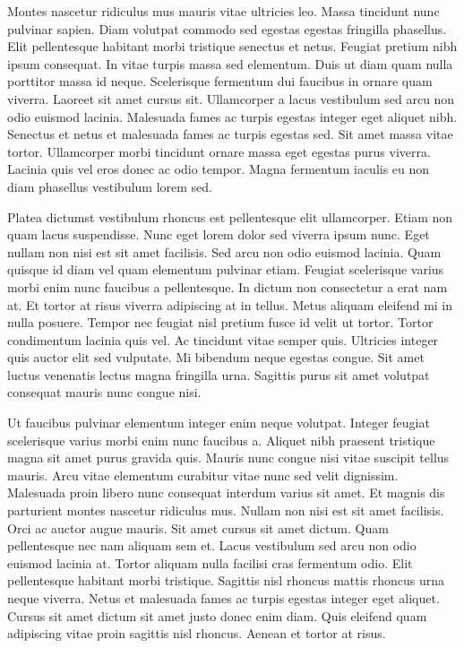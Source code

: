 \documentclass[11pt,a4paper]{article}
\begin{document}
Montes nascetur ridiculus mus mauris vitae ultricies leo. Massa tincidunt nunc pulvinar sapien. Diam volutpat commodo sed egestas egestas fringilla phasellus. Elit pellentesque habitant morbi tristique senectus et netus. Feugiat pretium nibh ipsum consequat. In vitae turpis massa sed elementum. Duis ut diam quam nulla porttitor massa id neque. Scelerisque fermentum dui faucibus in ornare quam viverra. Laoreet sit amet cursus sit. Ullamcorper a lacus vestibulum sed arcu non odio euismod lacinia. Malesuada fames ac turpis egestas integer eget aliquet nibh. Senectus et netus et malesuada fames ac turpis egestas sed. Sit amet massa vitae tortor. Ullamcorper morbi tincidunt ornare massa eget egestas purus viverra. Lacinia quis vel eros donec ac odio tempor. Magna fermentum iaculis eu non diam phasellus vestibulum lorem sed.

Platea dictumst vestibulum rhoncus est pellentesque elit ullamcorper. Etiam non quam lacus suspendisse. Nunc eget lorem dolor sed viverra ipsum nunc. Eget nullam non nisi est sit amet facilisis. Sed arcu non odio euismod lacinia. Quam quisque id diam vel quam elementum pulvinar etiam. Feugiat scelerisque varius morbi enim nunc faucibus a pellentesque. In dictum non consectetur a erat nam at. Et tortor at risus viverra adipiscing at in tellus. Metus aliquam eleifend mi in nulla posuere. Tempor nec feugiat nisl pretium fusce id velit ut tortor. Tortor condimentum lacinia quis vel. Ac tincidunt vitae semper quis. Ultricies integer quis auctor elit sed vulputate. Mi bibendum neque egestas congue. Sit amet luctus venenatis lectus magna fringilla urna. Sagittis purus sit amet volutpat consequat mauris nunc congue nisi.

Ut faucibus pulvinar elementum integer enim neque volutpat. Integer feugiat scelerisque varius morbi enim nunc faucibus a. Aliquet nibh praesent tristique magna sit amet purus gravida quis. Mauris nunc congue nisi vitae suscipit tellus mauris. Arcu vitae elementum curabitur vitae nunc sed velit dignissim. Malesuada proin libero nunc consequat interdum varius sit amet. Et magnis dis parturient montes nascetur ridiculus mus. Nullam non nisi est sit amet facilisis. Orci ac auctor augue mauris. Sit amet cursus sit amet dictum. Quam pellentesque nec nam aliquam sem et. Lacus vestibulum sed arcu non odio euismod lacinia at. Tortor aliquam nulla facilisi cras fermentum odio. Elit pellentesque habitant morbi tristique. Sagittis nisl rhoncus mattis rhoncus urna neque viverra. Netus et malesuada fames ac turpis egestas integer eget aliquet. Cursus sit amet dictum sit amet justo donec enim diam. Quis eleifend quam adipiscing vitae proin sagittis nisl rhoncus. Aenean et tortor at risus.
\end{document}
